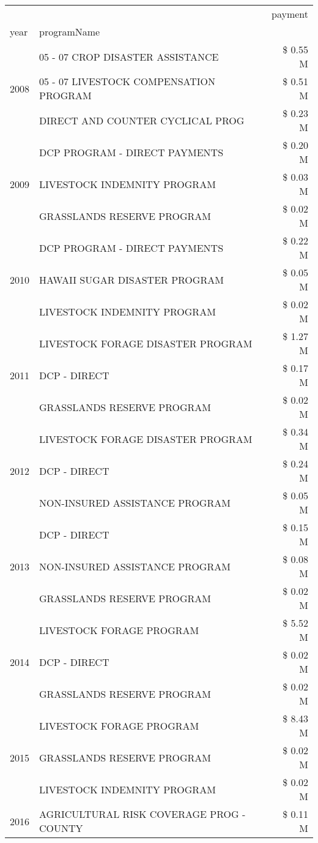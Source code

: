\begin{tabular}{llr}
\toprule
 &  & payment \\
year & programName &  \\
\midrule
\multirow[t]{3}{*}{2008} & 05 - 07 CROP DISASTER ASSISTANCE & \$ 0.55 M \\
 & 05 - 07 LIVESTOCK COMPENSATION PROGRAM & \$ 0.51 M \\
 & DIRECT AND COUNTER CYCLICAL PROG & \$ 0.23 M \\
\cline{1-3}
\multirow[t]{3}{*}{2009} & DCP PROGRAM - DIRECT PAYMENTS & \$ 0.20 M \\
 & LIVESTOCK INDEMNITY PROGRAM & \$ 0.03 M \\
 & GRASSLANDS RESERVE PROGRAM & \$ 0.02 M \\
\cline{1-3}
\multirow[t]{3}{*}{2010} & DCP PROGRAM - DIRECT PAYMENTS & \$ 0.22 M \\
 & HAWAII SUGAR DISASTER PROGRAM & \$ 0.05 M \\
 & LIVESTOCK INDEMNITY PROGRAM & \$ 0.02 M \\
\cline{1-3}
\multirow[t]{3}{*}{2011} & LIVESTOCK FORAGE DISASTER PROGRAM & \$ 1.27 M \\
 & DCP - DIRECT & \$ 0.17 M \\
 & GRASSLANDS RESERVE PROGRAM & \$ 0.02 M \\
\cline{1-3}
\multirow[t]{3}{*}{2012} & LIVESTOCK FORAGE DISASTER PROGRAM & \$ 0.34 M \\
 & DCP - DIRECT & \$ 0.24 M \\
 & NON-INSURED ASSISTANCE PROGRAM & \$ 0.05 M \\
\cline{1-3}
\multirow[t]{3}{*}{2013} & DCP - DIRECT & \$ 0.15 M \\
 & NON-INSURED ASSISTANCE PROGRAM & \$ 0.08 M \\
 & GRASSLANDS RESERVE PROGRAM & \$ 0.02 M \\
\cline{1-3}
\multirow[t]{3}{*}{2014} & LIVESTOCK FORAGE PROGRAM & \$ 5.52 M \\
 & DCP - DIRECT & \$ 0.02 M \\
 & GRASSLANDS RESERVE PROGRAM & \$ 0.02 M \\
\cline{1-3}
\multirow[t]{3}{*}{2015} & LIVESTOCK FORAGE PROGRAM & \$ 8.43 M \\
 & GRASSLANDS RESERVE PROGRAM & \$ 0.02 M \\
 & LIVESTOCK INDEMNITY PROGRAM & \$ 0.02 M \\
\cline{1-3}
\multirow[t]{3}{*}{2016} & AGRICULTURAL RISK COVERAGE PROG - COUNTY & \$ 0.11 M \\

\end{tabular}
